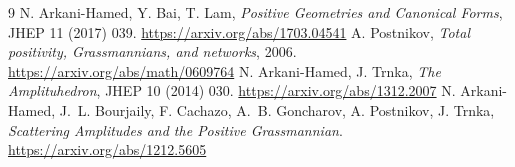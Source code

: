 \documentclass[11pt,a4paper]{article}
\begin{document}
\begin{thebibliography}{9}
 N. Arkani-Hamed, Y. Bai, T. Lam,
\emph{Positive Geometries and Canonical Forms},
JHEP 11 (2017) 039.
\url{https://arxiv.org/abs/1703.04541}
 A. Postnikov,
\emph{Total positivity, Grassmannians, and networks},
2006. \url{https://arxiv.org/abs/math/0609764}
 N. Arkani-Hamed, J. Trnka,
\emph{The Amplituhedron},
JHEP 10 (2014) 030.
\url{https://arxiv.org/abs/1312.2007}
 N. Arkani-Hamed, J.~L. Bourjaily,
F. Cachazo, A.~B. Goncharov, A. Postnikov, J. Trnka,
\emph{Scattering Amplitudes and the Positive Grassmannian}.
\url{https://arxiv.org/abs/1212.5605}
\end{thebibliography}
\end{document}
